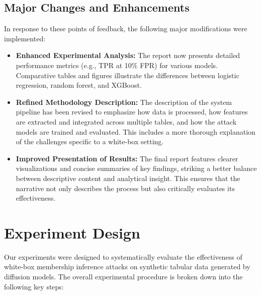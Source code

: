 \documentclass[12pt]{article}
\begin{document}
\subsection{Major Changes and Enhancements}
In response to these points of feedback, the following major modifications were implemented:
\begin{itemize}
    \item \textbf{Enhanced Experimental Analysis:}
    The report now presents detailed performance metrics (e.g., TPR at 10\% FPR) for various models. Comparative tables and figures illustrate the differences between logistic regression, random forest, and XGBoost.

    \item \textbf{Refined Methodology Description:}
    The description of the system pipeline has been revised to emphasize how data is processed, how features are extracted and integrated across multiple tables, and how the attack models are trained and evaluated. This includes a more thorough explanation of the challenges specific to a white-box setting.

    \item \textbf{Improved Presentation of Results:}
    The final report features clearer visualizations and concise summaries of key findings, striking a better balance between descriptive content and analytical insight. This ensures that the narrative not only describes the process but also critically evaluates its effectiveness.
\end{itemize}

\section{Experiment Design}
\label{sec:experiment-design}
Our experiments were designed to systematically evaluate the effectiveness of white-box membership inference attacks on synthetic tabular data generated by diffusion models. The overall experimental procedure is broken down into the following key steps:
\end{document}
